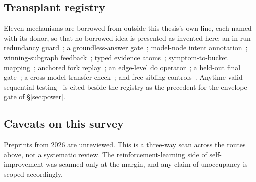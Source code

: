 \subsection*{Transplant registry}

Eleven mechanisms are borrowed from outside this thesis's own line, each
named with its donor, so that no borrowed idea is presented as invented
here: an in-run redundancy guard~\cite{ledger-t17}; a groundless-answer
gate~\cite{mapgraph}; model-node intent annotation~\cite{aer};
winning-subgraph feedback~\cite{graphmind}; typed evidence
atoms~\cite{mega}; symptom-to-bucket mapping~\cite{harnessfix}; anchored
fork replay~\cite{shepherd,car}; an edge-level do
operator~\cite{e2explainer}; a held-out final gate~\cite{regimes}; a
cross-model transfer check~\cite{better-harnesses}; and free sibling
controls~\cite{craft}. Anytime-valid sequential testing~\cite{pace} is
cited beside the registry as the precedent for the envelope gate of
\S\ref{sec:power}.

\subsection*{Caveats on this survey}

Preprints from 2026 are unreviewed. This is a three-way scan across the
routes above, not a systematic review. The reinforcement-learning side of
self-improvement was scanned only at the margin, and any claim of
unoccupancy is scoped accordingly.
